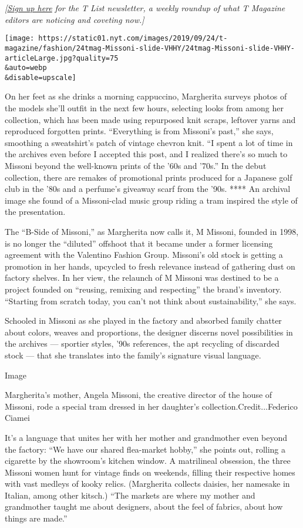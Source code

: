\emph{{[}}\href{https://www.nytimes.com/newsletters/t-list?module=inline}{\emph{Sign
up here}} \emph{for the T List newsletter, a weekly roundup of what T
Magazine editors are noticing and coveting now.{]}}

\texttt{[image: https://static01.nyt.com/images/2019/09/24/t-magazine/fashion/24tmag-Missoni-slide-VHHY/24tmag-Missoni-slide-VHHY-articleLarge.jpg?quality=75\\\&auto=webp\\\&disable=upscale]}

On her feet as she drinks a morning cappuccino, Margherita surveys
photos of the models she'll outfit in the next few hours, selecting
looks from among her collection, which has been made using repurposed
knit scraps, leftover yarns and reproduced forgotten prints.
``Everything is from Missoni's past,'' she says, smoothing a
sweatshirt's patch of vintage chevron knit. ``I spent a lot of time in
the archives even before I accepted this post, and I realized there's so
much to Missoni beyond the well-known prints of the '60s and '70s.'' In
the debut collection, there are remakes of promotional prints produced
for a Japanese golf club in the '80s and a perfume's giveaway scarf from
the '90s. **** An archival image she found of a Missoni-clad music group
riding a tram inspired the style of the presentation.

The ``B-Side of Missoni,'' as Margherita now calls it, M Missoni,
founded in 1998, is no longer the ``diluted'' offshoot that it became
under a former licensing agreement with the Valentino Fashion Group.
Missoni's old stock is getting a promotion in her hands, upcycled to
fresh relevance instead of gathering dust on factory shelves. In her
view, the relaunch of M Missoni was destined to be a project founded on
``reusing, remixing and respecting'' the brand's inventory. ``Starting
from scratch today, you can't not think about sustainability,'' she
says.

Schooled in Missoni as she played in the factory and absorbed family
chatter about colors, weaves and proportions, the designer discerns
novel possibilities in the archives --- sportier styles, '90s
references, the apt recycling of discarded stock --- that she translates
into the family's signature visual language.

Image

Margherita's mother, Angela Missoni, the creative director of the house
of Missoni, rode a special tram dressed in her daughter's
collection.Credit...Federico Ciamei

It's a language that unites her with her mother and grandmother even
beyond the factory: ``We have our shared flea-market hobby,'' she points
out, rolling a cigarette by the showroom's kitchen window. A matrilineal
obsession, the three Missoni women hunt for vintage finds on weekends,
filling their respective homes with vast medleys of kooky relics.
(Margherita collects daisies, her namesake in Italian, among other
kitsch.) ``The markets are where my mother and grandmother taught me
about designers, about the feel of fabrics, about how things are made.''

